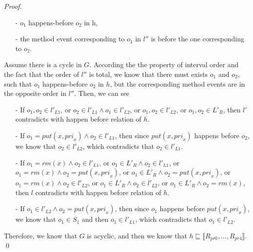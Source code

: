 \begin {proof}
\begin{itemize}
\setlength{\itemsep}{0.5pt}
\item[-] $o_1$ happens-before $o_2$ in h,

\item[-] the method event corresponding to $o_1$ in $l''$ is before the one corresponding to $o_2$.
\end{itemize}

Assume there is a cycle in $G$. According the the property of interval order and the fact that the order of $l''$ is total, we know that there must exists $o_1$ and $o_2$, such that $o_1$ happens-before $o_2$ in $h$, but the corresponding method events are in the opposite order in $l''$. Then, we can see

\begin{itemize}
\setlength{\itemsep}{0.5pt}
\item[-] If $o_1,o_2 \in l'_{L1}$, or $o_2 \in l'_{L1} \wedge o_1 \in l'_{L2}$, or $o_1,o_2 \in l'_{L2}$, or $o_1,o_2 \in L'_R$, then $l'$ contradicts with happen before relation of $h$.

\item[-] If $o_1 = \textit{put}(x,\textit{pri}_x) \wedge o_2 \in l'_{L1}$, then since $\textit{put}(x,\textit{pri}_x)$ happens before $o_2$, we know that $o_2 \in l'_{L2}$, which contradicts that $o_2 \in l'_{L1}$.

\item[-] If $o_1 = \textit{rm}(x) \wedge o_2 \in l'_{L1}$, or $o_1 \in L'_R \wedge o_2 \in l'_{L1}$, or $o_1 = \textit{rm}(x) \wedge o_2 = \textit{put}(x,\textit{pri}_x)$, or $o_1 \in L'_R \wedge o_2 = \textit{put}(x,\textit{pri}_x)$, or $o_1 = \textit{rm}(x) \wedge o_2 \in l'_{L2}$, or $o_1 \in L'_R \wedge o_2 \in l'_{L2}$, or $o_1 \in L'_R \wedge o_2 = \textit{rm}(x)$, then $l$ contradicts with happen before relation of $h$.

\item[-] If $o_1 \in l'_{L2} \wedge o_2 = \textit{put}(x,\textit{pri}_x)$, then since $o_1$ happens before $\textit{put}(x,\textit{pri}_x)$, we know that $o_1 \in S_1$ and then $o_1 \in l'_{L1}$, which contradicts that $o_1 \in l'_{L2}$.
\end{itemize}

Therefore, we know that $G$ is acyclic, and then we know that $h \sqsubseteq \llbracket R_{\textit{pr0}},\ldots,R_{\textit{pr4}} \rrbracket$. \qed

\end {proof}

